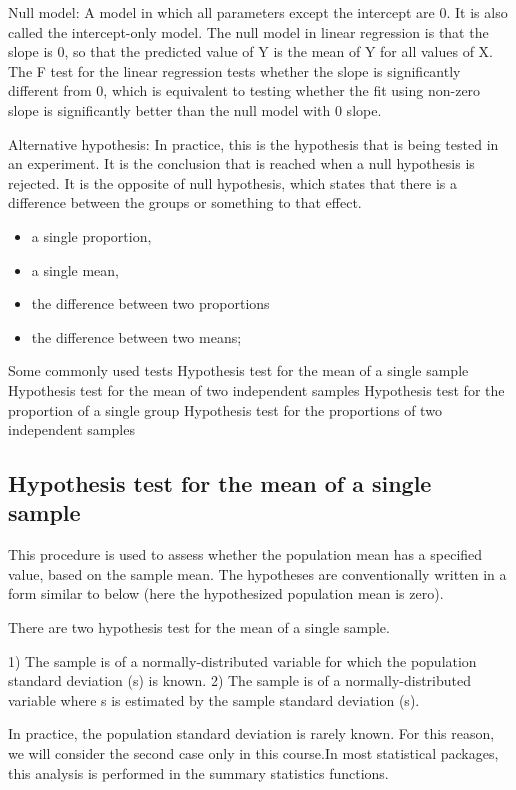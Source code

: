 \documentclass[12pt, a4paper]{report}
\begin{document}
Null model: A model in which all parameters except the intercept are 0. It is also called the intercept-only model. The null model in linear regression is that the slope is 0, so that the predicted value of Y is the mean of Y for all values of X. The F test for the linear regression tests whether the slope is significantly different from 0, which is equivalent to testing whether the fit using non-zero slope is significantly better than the null model with 0 slope.

Alternative hypothesis: In practice, this is the hypothesis that is being tested in an experiment. It is the conclusion that is reached when a null hypothesis is rejected. It is the opposite of null hypothesis, which states that there is a difference between the groups or something to that effect.


\begin{itemize}
\item a single proportion,
\item a single mean,
\item the difference between two proportions	
\item the difference between two means;
\end{itemize}

Some commonly used tests
   Hypothesis test for the mean of a single sample
   Hypothesis test for the mean of two independent samples
   Hypothesis test for the proportion of a single group
   Hypothesis test for the proportions of two independent samples


\subsection{Hypothesis test for the mean of a single sample}
This procedure is used to assess whether the population mean  has a specified value, based on the sample mean. The hypotheses are conventionally written in a form similar to below (here the hypothesized population mean is zero).


There are two hypothesis test for the mean of a single sample.

1) The sample is of a normally-distributed variable for which the population standard deviation (s) is known.
2) The sample is of a normally-distributed variable where s is estimated by the sample standard deviation (s).

In practice, the population standard deviation is rarely known. For this reason, we will consider the second case only in this course.In most statistical packages, this analysis is performed in the summary statistics functions.
\end{document}
